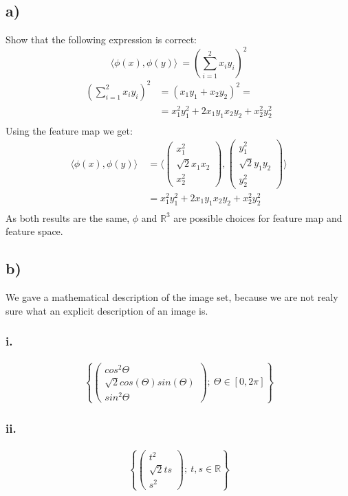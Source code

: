 \documentclass{article}
\newcommand{\R}[0]{\mathbb{R}}
\begin{document}
\subsection*{a)}
Show that the following expression is correct:
\begin{equation}
    \langle{}\phi(x), \phi(y)\rangle{}~= \left(\sum_{i=1}^2 x_i y_i \right)^2
\end{equation}
\begin{align}
    \left(\sum_{i=1}^2 x_i y_i \right)^2 &= \left(x_1 y_1 + x_2 y_2 \right)^2 = \\
    & = x_1^2 y_1^2 + 2 x_1 y_1 x_2 y_2 + x_2^2 y_2^2  \\
\end{align}
Using the feature map we get:
\begin{align}
    \langle{}\phi(x), \phi(y)\rangle{}~ &= \langle{}
        \begin{pmatrix}x_1^2 \\ \sqrt{2} x_1 x_2 \\ x_2^2 \end{pmatrix},
        \begin{pmatrix}y_1^2 \\ \sqrt{2} y_1 y_2 \\ y_2^2 \end{pmatrix} \rangle{} \\
    & = x_1^2 y_1^2 + 2 x_1 y_1 x_2 y_2 + x_2^2 y_2^2  \\
\end{align}
As both results are the same, $\phi$ and $\R^3$ are possible choices for feature map
and feature space.

\subsection*{b)}
We gave a mathematical description of the image set, because we are not realy sure what an explicit description of an image is.
\subsubsection*{i.}
\begin{gather*}
\left\{ \left( \begin{array}{c}cos^2 \Theta \\ \sqrt{2} cos(\Theta) sin(\Theta) \\ sin^2 \Theta \end{array} \right); \ \Theta \in [0, 2\pi] \right\}
\end{gather*}
\subsubsection*{ii.}
\begin{gather*}
\left\{ \left( \begin{array}{c}t^2 \\ \sqrt{2} t s \\ s^2 \end{array} \right); \ t,s \in \R \right\} 
\end{gather*}
\end{document}
